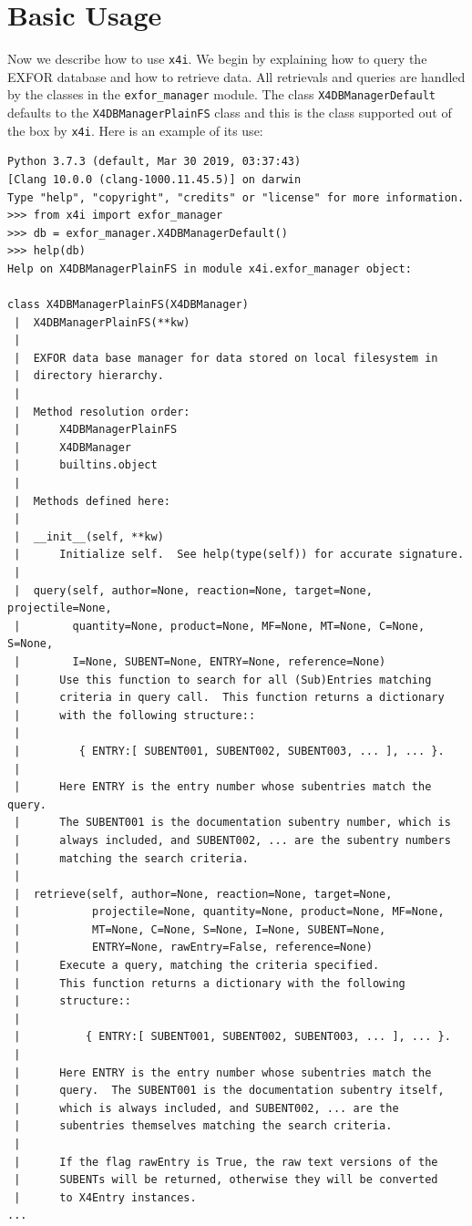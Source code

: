 \documentclass[11pt]{article}
\newcommand{\xfouri}{\texttt{x4i}}
\begin{document}
\section{Basic Usage}
Now we describe how to use \xfouri.  We begin by explaining how to query the EXFOR database and how to retrieve data.  All retrievals and queries are handled by the classes in the \texttt{exfor\_manager} module.  The class \texttt{X4DBManagerDefault} defaults to the \texttt{X4DBManagerPlainFS} class and this is the class supported out of the box by \xfouri.  Here is an example of its use:
\begin{verbatim}
Python 3.7.3 (default, Mar 30 2019, 03:37:43)
[Clang 10.0.0 (clang-1000.11.45.5)] on darwin
Type "help", "copyright", "credits" or "license" for more information.
>>> from x4i import exfor_manager
>>> db = exfor_manager.X4DBManagerDefault()
>>> help(db)
Help on X4DBManagerPlainFS in module x4i.exfor_manager object:

class X4DBManagerPlainFS(X4DBManager)
 |  X4DBManagerPlainFS(**kw)
 |
 |  EXFOR data base manager for data stored on local filesystem in
 |  directory hierarchy.
 |
 |  Method resolution order:
 |      X4DBManagerPlainFS
 |      X4DBManager
 |      builtins.object
 |
 |  Methods defined here:
 |
 |  __init__(self, **kw)
 |      Initialize self.  See help(type(self)) for accurate signature.
 |
 |  query(self, author=None, reaction=None, target=None, projectile=None,
 |        quantity=None, product=None, MF=None, MT=None, C=None, S=None,
 |        I=None, SUBENT=None, ENTRY=None, reference=None)
 |      Use this function to search for all (Sub)Entries matching
 |      criteria in query call.  This function returns a dictionary
 |      with the following structure::
 |
 |         { ENTRY:[ SUBENT001, SUBENT002, SUBENT003, ... ], ... }.
 |
 |      Here ENTRY is the entry number whose subentries match the query.
 |      The SUBENT001 is the documentation subentry number, which is
 |      always included, and SUBENT002, ... are the subentry numbers
 |      matching the search criteria.
 |
 |  retrieve(self, author=None, reaction=None, target=None,
 |           projectile=None, quantity=None, product=None, MF=None,
 |           MT=None, C=None, S=None, I=None, SUBENT=None,
 |           ENTRY=None, rawEntry=False, reference=None)
 |      Execute a query, matching the criteria specified.
 |      This function returns a dictionary with the following
 |      structure::
 |
 |          { ENTRY:[ SUBENT001, SUBENT002, SUBENT003, ... ], ... }.
 |
 |      Here ENTRY is the entry number whose subentries match the
 |      query.  The SUBENT001 is the documentation subentry itself,
 |      which is always included, and SUBENT002, ... are the
 |      subentries themselves matching the search criteria.
 |
 |      If the flag rawEntry is True, the raw text versions of the
 |      SUBENTs will be returned, otherwise they will be converted
 |      to X4Entry instances.
...
\end{verbatim}
\end{document}
